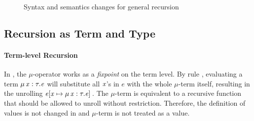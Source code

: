 \begin{figure}
	\gram{\newsyntax}\ottinterrule
	\ottdefnstepXXrec{}\ottinterrule
	\ottdefnexprXXrec{}
	\caption{Syntax and semantics changes for general recursion}
    \label{fig:rec:ext}
\end{figure}

\subsection{Recursion as Term and Type}
\label{subsec:recur}
\paragraph{Term-level Recursion}

In \name, the $ \mu $-operator works as a \emph{fixpoint} on the term
level. By rule , evaluating a term $\mu \, \mathit{x}  :  \tau  .  \mathit{e}$ will
substitute all $\mathit{x}$'s in $e$ with the whole $ \mu $-term itself,
resulting in the unrolling $\mathit{e}  [  \mathit{x}  \mapsto  \mu \, \mathit{x}  :  \tau  .  \mathit{e}  ] \,$. The
$ \mu $-term is equivalent to a recursive function that should be
allowed to unroll without restriction. Therefore, the definition of
values is not changed in \name and $ \mu $-term is not treated as a
value. 

 

